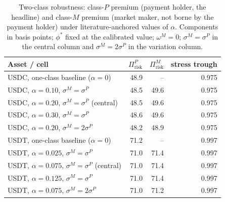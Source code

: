 \begin{table}[H]
\centering
\caption{Two-class robustness: class-$P$ premium (payment holder, the headline) and class-$M$ premium (market maker, not borne by the payment holder) under literature-anchored values of $\alpha$. Components in basis points; $\phi^*$ fixed at the calibrated value; $\omega^M = 0$; $\sigma^M = \sigma^P$ in the central column and $\sigma^M = 2 \sigma^P$ in the variation column.}\label{tab:two_class_robustness}
\begin{tabular}{lrrr}
\toprule
Asset / cell                                          & $\Pi_{\text{risk}}^P$ & $\Pi_{\text{risk}}^M$ & stress trough \\
\midrule
USDC, one-class baseline ($\alpha = 0$)               & 48.9 & --   & 0.975 \\
USDC, $\alpha = 0.10$, $\sigma^M = \sigma^P$          & 48.5 & 49.6 & 0.975 \\
USDC, $\alpha = 0.20$, $\sigma^M = \sigma^P$ (central) & 48.5 & 49.6 & 0.975 \\
USDC, $\alpha = 0.30$, $\sigma^M = \sigma^P$          & 48.6 & 49.6 & 0.975 \\
USDC, $\alpha = 0.20$, $\sigma^M = 2 \sigma^P$        & 48.2 & 48.9 & 0.975 \\
\midrule
USDT, one-class baseline ($\alpha = 0$)               & 71.2 & --   & 0.997 \\
USDT, $\alpha = 0.025$, $\sigma^M = \sigma^P$         & 71.0 & 71.4 & 0.997 \\
USDT, $\alpha = 0.075$, $\sigma^M = \sigma^P$ (central) & 71.0 & 71.4 & 0.997 \\
USDT, $\alpha = 0.125$, $\sigma^M = \sigma^P$         & 71.0 & 71.4 & 0.997 \\
USDT, $\alpha = 0.075$, $\sigma^M = 2 \sigma^P$       & 71.0 & 71.2 & 0.997 \\
\bottomrule
\end{tabular}
\end{table}

